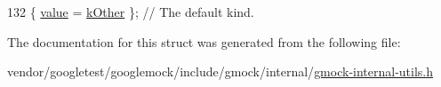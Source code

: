 \begin{DoxyCode}
132 \{ \hyperlink{structtesting_1_1internal_1_1KindOf_a4866389a4bc8d5522b5f8ae61a42f520a30d28b30579739dfb2d410825ac3aaa8}{value} = \hyperlink{namespacetesting_1_1internal_aa8747bda20137c9aa7f846dee830e686ad47f29150ab7a9ec8ce2491f44537347}{kOther} \};  \textcolor{comment}{// The default kind.}
\end{DoxyCode}


The documentation for this struct was generated from the following file\+:\begin{DoxyCompactItemize}
\item 
vendor/googletest/googlemock/include/gmock/internal/\hyperlink{gmock-internal-utils_8h}{gmock-\/internal-\/utils.\+h}\end{DoxyCompactItemize}
